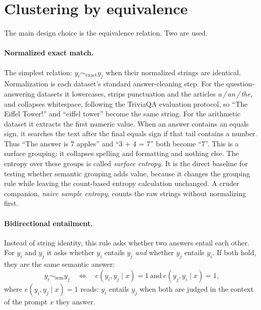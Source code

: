 \section{Clustering by equivalence}
\label{sec:clustering}

The main design choice is the equivalence relation. Two are used.

\paragraph{Normalized exact match.} The simplest relation:
$y_i \sim_{\mathrm{exact}} y_j$ when their normalized strings are identical.
Normalization is each dataset's standard answer-cleaning step. For the
question-answering datasets it lowercases, strips punctuation and the articles
\emph{a\,/\,an\,/\,the}, and collapses whitespace, following the TriviaQA
evaluation protocol, so ``The Eiffel Tower!'' and ``eiffel tower'' become the
same string. For the arithmetic dataset it extracts the first numeric value.
When an answer contains an equals sign, it searches the text after the final
equals sign if that tail contains a number. Thus ``The answer is 7 apples''
and ``3 + 4 = 7'' both become ``7''. This is a surface grouping: it collapses
spelling and formatting and nothing else. The entropy over these groups is
called \emph{surface entropy}. It is the direct baseline for testing whether
semantic grouping adds value, because it changes the grouping rule while
leaving the count-based entropy calculation unchanged. A cruder companion,
\emph{naive sample entropy}, counts the raw strings without normalizing first.

\paragraph{Bidirectional entailment.} Instead of string identity, this rule
asks whether two answers entail each other. For $y_i$ and $y_j$ it asks
whether $y_i$ entails $y_j$ \emph{and} whether $y_j$ entails $y_i$. If both
hold, they are the same semantic answer:
\[
  y_i \sim_{\mathrm{sem}} y_j
  \quad\Longleftrightarrow\quad
  e(y_i, y_j \mid x) = 1 \ \text{and}\ e(y_j, y_i \mid x) = 1 ,
\]
where $e(y_i, y_j \mid x) = 1$ reads: $y_i$ entails $y_j$ when both are judged
in the context of the prompt $x$ they answer.

